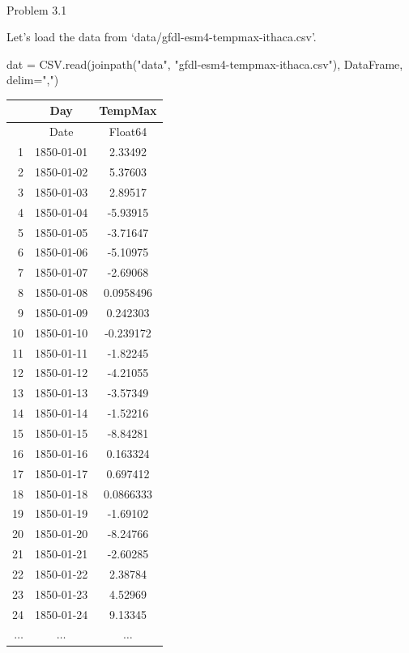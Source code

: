 \documentclass[
  letterpaper,
  DIV=11,
  numbers=noendperiod]{scrartcl}
\makeatletter
\let\oldparagraph\paragraph
\renewcommand{\paragraph}{
    \@ifstar
      \xxxParagraphStar
      \xxxParagraphNoStar
  }
\newcommand{\xxxParagraphStar}[1]{\oldparagraph*{#1}\mbox{}}
\newcommand{\xxxParagraphNoStar}[1]{\oldparagraph{#1}\mbox{}}
\newenvironment{Shaded}{\begin{snugshade}}{\end{snugshade}}
\newcommand{\FunctionTok}[1]{\textcolor[rgb]{0.28,0.35,0.67}{#1}}
\newcommand{\NormalTok}[1]{\textcolor[rgb]{0.00,0.23,0.31}{#1}}
\newcommand{\OperatorTok}[1]{\textcolor[rgb]{0.37,0.37,0.37}{#1}}
\newcommand{\StringTok}[1]{\textcolor[rgb]{0.13,0.47,0.30}{#1}}
\makeatother
\begin{document}
\paragraph{Problem 3.1}\label{problem-3.1}

Let's load the data from `data/gfdl-esm4-tempmax-ithaca.csv'.

\begin{Shaded}
\begin{Highlighting}[]
\NormalTok{dat }\OperatorTok{=}\NormalTok{ CSV.}\FunctionTok{read}\NormalTok{(}\FunctionTok{joinpath}\NormalTok{(}\StringTok{"data"}\NormalTok{, }\StringTok{"gfdl{-}esm4{-}tempmax{-}ithaca.csv"}\NormalTok{), DataFrame, delim}\OperatorTok{=}\StringTok{","}\NormalTok{)}
\end{Highlighting}
\end{Shaded}

\begin{tabular}{r|cc}
    & Day & TempMax\\
    \hline
    & Date & Float64\\
    \hline
    1 & 1850-01-01 & 2.33492 \\
    2 & 1850-01-02 & 5.37603 \\
    3 & 1850-01-03 & 2.89517 \\
    4 & 1850-01-04 & -5.93915 \\
    5 & 1850-01-05 & -3.71647 \\
    6 & 1850-01-06 & -5.10975 \\
    7 & 1850-01-07 & -2.69068 \\
    8 & 1850-01-08 & 0.0958496 \\
    9 & 1850-01-09 & 0.242303 \\
    10 & 1850-01-10 & -0.239172 \\
    11 & 1850-01-11 & -1.82245 \\
    12 & 1850-01-12 & -4.21055 \\
    13 & 1850-01-13 & -3.57349 \\
    14 & 1850-01-14 & -1.52216 \\
    15 & 1850-01-15 & -8.84281 \\
    16 & 1850-01-16 & 0.163324 \\
    17 & 1850-01-17 & 0.697412 \\
    18 & 1850-01-18 & 0.0866333 \\
    19 & 1850-01-19 & -1.69102 \\
    20 & 1850-01-20 & -8.24766 \\
    21 & 1850-01-21 & -2.60285 \\
    22 & 1850-01-22 & 2.38784 \\
    23 & 1850-01-23 & 4.52969 \\
    24 & 1850-01-24 & 9.13345 \\
    $\dots$ & $\dots$ & $\dots$ \\
\end{tabular}
\end{document}
